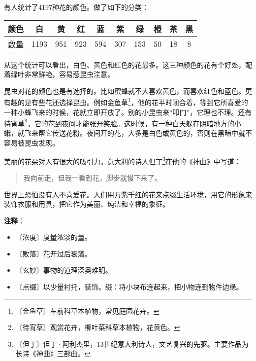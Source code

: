 \documentclass[12pt,UTF-8,openany]{ctexbook}
\begin{document}
\begin{normalsize}
    有人统计了4197种花的颜色。做了如下的分类：
    
    \begin{center}\begin{tabular}{| c | c | c | c | c | c | c | c | c | c |}
    
    \hline
    
    颜色 & 白 & 黄 & 红 & 蓝 & 紫 & 绿 & 橙 & 茶 & 黑 \\
    
    \hline
    
    数量 & 1193 & 951 & 923 & 594 & 307 & 153 & 50 & 18 & 8 \\
    
    \hline
    
    \end{tabular}\end{center}
    
    从这个统计可以看出，白色、黄色和红色的花最多。这三种颜色的花有个好处，配着绿叶非常鲜艳，容易惹昆虫注意。
    
    昆虫对花的颜色也是有选择的。比如蜜蜂就不大喜欢黄色，而喜欢红色和蓝色。更有趣的是有些花还选择昆虫。例如金鱼草\footnote{〔金鱼草〕车前科草本植物，常见庭园花卉。}，他的花平时闭合着，等到它所喜爱的一种小蜂飞来的时候，花就立即开放了。别的小昆虫来“叩门”，它理也不理。还有待宵草\footnote{〔待宵草〕观赏花卉，柳叶菜科草本植物，花黄色。}，它的花到夜间才能张开笑脸。这时候，有一种白天躲在阴暗地方的小蛾，就飞来帮它传送花粉。夜间开的花，大多是白色或黄色的，否则在黑暗中就不容易被昆虫发现。
    
    美丽的花朵对人有很大的吸引力。意大利的诗人但丁\footnote{〔但丁〕但丁·阿利杰里，13世纪意大利诗人，文艺复兴的先驱。主要作品为长诗《神曲》三部曲。}在他的《神曲》中写道：
    
    \begin{quotation}
    
    我向前走，但我一看到花，脚步就慢下来了。
    
    \end{quotation}
    
    世界上恐怕没有人不喜爱花。人们用万紫千红的花来点缀生活环境，用它的形象来装饰衣服和用具，把它作为美丽、纯洁和幸福的象征。
    
\end{normalsize}


\newpage

\textbf{注释}：

\vspace{-1em}

\begin{itemize}
    \setlength\itemsep{-0.2em}
    \item 〔浓度〕度量浓淡的量。
    \item 〔败落〕花开过后衰落。
    \item 〔玄妙〕事物的道理深奥难明。
    \item 〔点缀〕以少量衬托，装饰。缀：将小块布连起来，把小物连到物件边缘。
\end{itemize}
\end{document}
